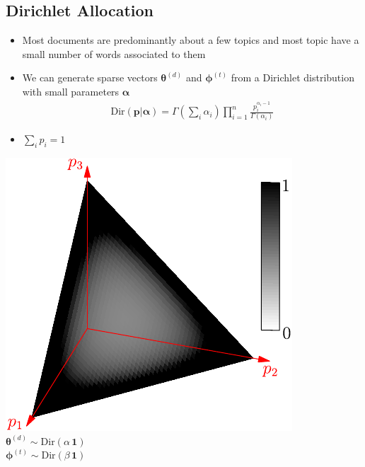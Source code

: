 
\begin{slide}
\section[-2]{Dirichlet Allocation}

\begin{minipage}{0.5\linewidth}
  \begin{PauseHighLight}
  \begin{itemize}
  \item Most documents are predominantly about a few topics and most
    topic have a small number of words associated to them\pause
  \item We can generate sparse vectors $\bm{\theta}^{(d)}$ and
    $\bm{\phi}^{(t)}$ from a Dirichlet distribution with small parameters
    $\bm{\alpha}$ 
    \begin{align*}
      \mathrm{Dir}(\bm{p}|\bm{\alpha}) = \Gamma\!\left(\sum_i
      \alpha_i\right) \prod_{i=1}^n
      \frac{p_i^{\alpha_i-1}}{\Gamma(\alpha_i)}
    \end{align*}
  \item $\sum\limits_{i} p_i=1$\pause
    \end{itemize}
\end{PauseHighLight}
\end{minipage}\hfil
\begin{minipage}{0.4\linewidth}
  \begin{center}
    \includegraphics[width=0.95\linewidth]{dirichletSparse}\\
    $\bm{\theta}^{(d)} \sim \mathrm{Dir}(\alpha\,\bm{1})$\\
    $\bm{\phi}^{(t)}\sim \mathrm{Dir}(\beta\,\bm{1})$\pause
  \end{center}
\end{minipage}


\end{slide}

